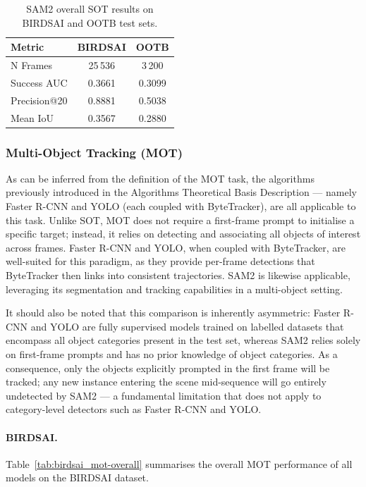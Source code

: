\documentclass[11pt]{article}
\begin{document}
\begin{table}[htbp]
\centering
\begin{tabular}{l cc}
\toprule
\textbf{Metric} & \textbf{BIRDSAI} & \textbf{OOTB} \\
\midrule
N Frames     & 25\,536 & 3\,200 \\
Success AUC  & 0.3661  & 0.3099 \\
Precision@20 & 0.8881  & 0.5038 \\
Mean IoU     & 0.3567  & 0.2880 \\
\bottomrule
\end{tabular}
\caption{SAM2 overall SOT results on BIRDSAI and OOTB test sets.}
\label{tab:sot-overall}
\end{table}

\hypertarget{Multi-Object Tracking (MOT)}{%
\subsubsection{Multi-Object Tracking (MOT)}\label{OP_MOT}}

As can be inferred from the definition of the MOT task, the algorithms previously introduced in the Algorithms Theoretical Basis Description — namely Faster R-CNN and YOLO (each coupled with ByteTracker), are all applicable to this task. 
Unlike SOT, MOT does not require a first-frame prompt to initialise a specific target; instead, it relies on detecting and associating all objects of interest across frames. 
Faster R-CNN and YOLO, when coupled with ByteTracker, are well-suited for this paradigm, as they provide per-frame detections that ByteTracker then links into consistent trajectories. 
SAM2 is likewise applicable, leveraging its segmentation and tracking capabilities in a multi-object setting.

It should also be noted that this comparison is inherently asymmetric: Faster R-CNN and YOLO are fully supervised models trained on labelled datasets that encompass all object categories present in the test set, whereas SAM2 relies solely on first-frame prompts and has no prior knowledge of object categories.
As a consequence, only the objects explicitly prompted in the first frame will be tracked; any new instance entering the scene mid-sequence will go entirely undetected by SAM2 — a fundamental limitation that does not apply to category-level detectors such as Faster R-CNN and YOLO.

\paragraph{BIRDSAI.}
Table~\ref{tab:birdsai_mot-overall} summarises the overall MOT performance of all models on the BIRDSAI dataset.
\end{document}
